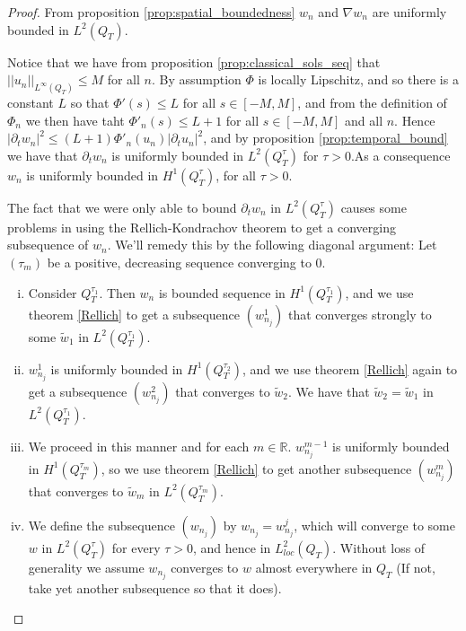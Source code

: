 \documentclass[11pt, a4paper]{article}
\begin{document}
\begin{proof}
From proposition \ref{prop:spatial_boundedness} $w_n$ and $\nabla w_n$ are uniformly bounded in $L^2(Q_T)$.

Notice that we have from proposition \ref{prop:classical_sols_seq} that $||u_n||_{L^\infty(Q_T)} \leq M$ for all $n$. By assumption $\Phi$ is locally Lipschitz, and so there is a constant $L$ so that $\Phi'(s) \leq L$ for all $s \in [-M, M]$, and from the definition of $\Phi_n$ we then have taht $\Phi'_n(s) \leq L+1$ for all $s\in [-M,M]$ and all $n$. Hence $|\partial_t w_n|^2 \leq  (L+1)\Phi'_n(u_n)|\partial_t u_n|^2$, and by proposition \ref{prop:temporal_bound} we have that $\partial_t w_n$ is uniformly bounded in $L^2(Q_T^\tau)$ for $\tau > 0$.As a consequence $w_n$ is uniformly bounded in $H^1(Q_T^\tau)$, for all $\tau > 0$.

 The fact that we were only able to bound $\partial_t w_n$ in $L^2(Q_T^\tau)$ causes some problems in using the Rellich-Kondrachov theorem to get a converging subsequence of $w_n$. We'll remedy this by the following diagonal argument:
	Let $(\tau_m)$ be a positive, decreasing sequence converging to $0$.
	\begin{enumerate}[i)]
	\item Consider $Q_T^{\tau_1}$. Then $w_n$ is bounded sequence in $H^1(Q_T^{\tau_1})$, and we use theorem \ref{Rellich} to get a subsequence $(w_{n_j}^1)$ that converges strongly to some $\tilde{w}_1$ in $L^2(Q_T^{\tau_1})$.
	
	\item $w_{n_j}^1$ is uniformly bounded in $H^1(Q_T^{\tau_2})$, and we use theorem \ref{Rellich} again to get a subsequence $(w_{n_j}^2)$ that converges to $\tilde{w}_2$. We have that $\tilde{w}_2 = \tilde{w}_1$ in $L^2(Q_T^{\tau_1})$.
	
	\item We proceed in this manner and for each $m \in \mathbb{R}$. $w_{n_j}^{m-1}$ is uniformly bounded in $H^1(Q_T^{\tau_m})$, so we use theorem \ref{Rellich} to get another subsequence $(w_{n_j}^m)$ that converges to $\tilde{w}_m$ in $L^2(Q_T^{\tau_m})$.
	
	\item We define the subsequence $(w_{n_j})$ by $w_{n_j} = w_{n_j}^j$, which will converge to some $w$ in $L^2(Q_T^\tau)$ for every $\tau > 0$, and hence in $L^2_{loc}(Q_T)$. Without loss of generality we assume $w_{n_j}$ converges to $w$ almost everywhere in $Q_T$ (If not, take yet another subsequence so that it does).
\end{enumerate}	 


\end{proof}
\end{document}
